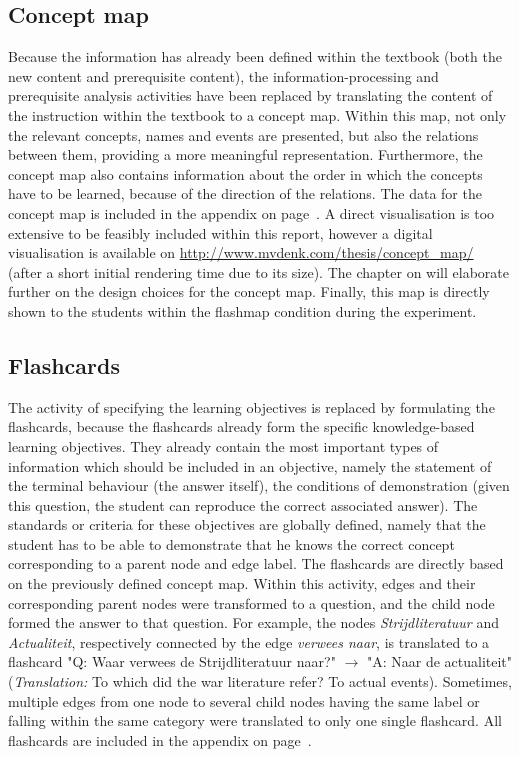\subsection{Concept map}

Because the information has already been defined within the textbook (both the new content and prerequisite content), the information-processing and prerequisite analysis activities have been replaced by translating the content of the instruction within the textbook to a concept map. Within this map, not only the relevant concepts, names and events are presented, but also the relations between them, providing a more meaningful representation. Furthermore, the concept map also contains information about the order in which the concepts have to be learned, because of the direction of the relations. The data for the concept map is included in the appendix on page~\pageref{ch:concept_map}. A direct visualisation is too extensive to be feasibly included within this report, however a digital visualisation is available on \url{http://www.mvdenk.com/thesis/concept_map/} (after a short initial rendering time due to its size). The chapter on  will elaborate further on the design choices for the concept map. Finally, this map is directly shown to the students within the flashmap condition during the experiment.

\subsection{Flashcards}

The activity of specifying the learning objectives is replaced by formulating the flashcards, because the flashcards already form the specific knowledge-based learning objectives. They already contain the most important types of information which should be included in an objective, namely the statement of the terminal behaviour (the answer itself), the conditions of demonstration (given this question, the student can reproduce the correct associated answer). The standards or criteria for these objectives are globally defined, namely that the student has to be able to demonstrate that he knows the correct concept corresponding to a parent node and edge label. The flashcards are directly based on the previously defined concept map. Within this activity, edges and their corresponding parent nodes were transformed to a question, and the child node formed the answer to that question. For example, the nodes \emph{Strijdliteratuur} and \emph{Actualiteit}, respectively connected by the edge \emph{verwees naar}, is translated to a flashcard "Q: Waar verwees de Strijdliteratuur naar?" $\rightarrow$ "A: Naar de actualiteit" (\emph{Translation:} To which did the war literature refer? To actual events). Sometimes, multiple edges from one node to several child nodes having the same label or falling within the same category were translated to only one single flashcard. All flashcards are included in the appendix on page~\pageref{ch:flashcards}.

